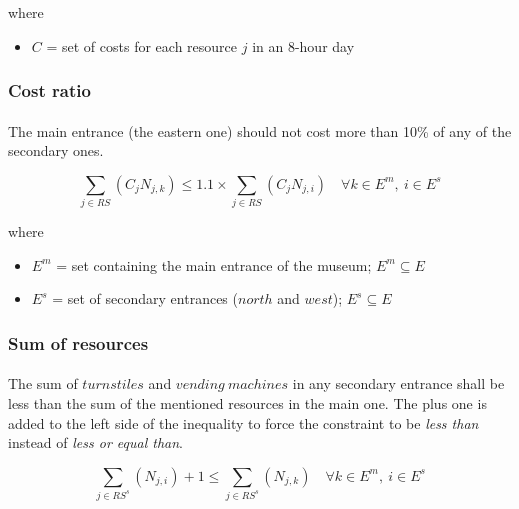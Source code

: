 where

\begin{itemize}
    \item[] $C$ = set of costs for each resource $j$ in an 8-hour day
\end{itemize}






\subsubsection{Cost ratio}

\paragraph{}
The main entrance (the eastern one) should not cost more than 10\% of any of the secondary ones.


\begin{equation}
    \sum_{j \in RS}\left({C_j N_{j,k}}\right) \leq 1.1 \times \sum_{j \in RS}\left({C_j N_{j,i}}\right) \quad \forall k \in E^m,\ i \in E^s
\end{equation}

where

\begin{itemize}
    \item[] $E^m$ = set containing the main entrance of the museum; $E^m \subseteq E$
    \item[] $E^s$ = set of secondary entrances ($north$ and $west$); $E^s \subseteq E$
\end{itemize}








\subsubsection{Sum of resources}

\paragraph{}
The sum of $turnstiles$ and $vending\ machines$ in any secondary entrance shall be less than the sum of the mentioned resources in the main one. 
The plus one is added to the left side of the inequality to force the constraint to be \textit{less than} instead of \textit{less or equal than}.

\begin{equation}
    \sum_{j \in RS^s} {\left (N_{j,i}\right)} + 1 \leq \sum_{j \in RS^s} {\left (N_{j,k}\right)} \quad \forall k \in E^m,\ i \in E^s
\end{equation}

